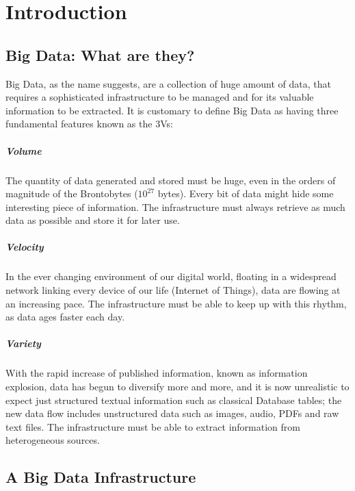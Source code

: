 \chapter{Introduction}

\section{Big Data: What are they?}

Big Data, as the name suggests, are a collection of huge amount of data, that requires a sophisticated infrastructure to be managed and for its valuable information to be extracted.\newline
It is customary to define Big Data as having three fundamental features known as the 3Vs:

\paragraph{Volume}

The quantity of data generated and stored must be huge, even in the orders of magnitude of the Brontobytes ($10^{27}$ bytes).
Every bit of data might hide some interesting piece of information. The infrastructure must always retrieve as much data as possible and store it for later use.

\paragraph{Velocity}

In the ever changing environment of our digital world, floating in a widespread network linking every device of our life (Internet of Things), data are flowing at an increasing pace. The infrastructure must be able to keep up with this rhythm, as data ages faster each day.

\paragraph{Variety}

With the rapid increase of published information, known as information explosion, data has begun to diversify more and more, and it is now unrealistic to expect just structured textual information such as classical Database tables; the new data flow includes unstructured data such as images, audio, PDFs and raw text files. The infrastructure must be able to extract information from heterogeneous sources.


\section{A Big Data Infrastructure}\label{Chapter2}

